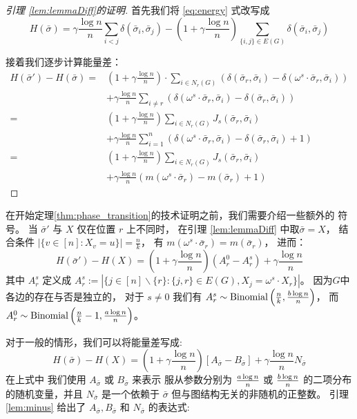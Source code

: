 \begin{proof}[引理 \ref{lem:lemmaDiff}的证明]
	首先我们将
  \eqref{eq:energy} 式改写成
	\begin{equation*}
	H(\bar{\sigma}) = \gamma \frac{\log n}{n} \sum_{i < j} \delta(\bar{\sigma}_i, \bar{\sigma}_j)
	- (1 + \gamma\frac{\log n}{n}) \sum_{ \{i, j\} \in E(G)} \delta(\bar{\sigma}_i, \bar{\sigma}_j)
	\end{equation*}
	
	接着我们逐步计算能量差：
  \begin{align*}
	H(\bar{\sigma}') - H(\bar{\sigma}) =& 
  \left(1 + \gamma\frac{\log n}{n}
  \right)
  \cdot \sum_{i \in N_r(G)} (\delta(\bar{\sigma}_r, \bar{\sigma}_i) -
	\delta(\omega^s \cdot \bar{\sigma}_r, \bar{\sigma}_i)) \\
	&+ \gamma \frac{\log n}{n}\sum_{i\neq r}
	( \delta(\omega^s \cdot \bar{\sigma}_r, \bar{\sigma}_i) -
	\delta( \bar{\sigma}_r, \bar{\sigma}_i) ) \\
	 =& \left(
     1 + \gamma\frac{\log n}{n}
     \right)
   \sum_{i \in N_r(G)} J_s(\bar{\sigma}_r, \bar{\sigma}_i) \\
	&+ \gamma \frac{\log n}{n}\sum_{i=1}^n
	( \delta(\omega^s \cdot \bar{\sigma}_r, \bar{\sigma}_i) -
	\delta( \bar{\sigma}_r, \bar{\sigma}_i) +1) \\
	=& \left(1+\gamma \frac{\log n}{n}
  \right)
  \sum_{i \in N_r(G)} J_s(\bar{\sigma}_r, \bar{\sigma}_i)\\
	&+ \gamma \frac{\log n}{n} (m(\omega^s \cdot \bar{\sigma}_r)-m(\bar{\sigma}_r)+1)
	\end{align*}
\end{proof}

在开始定理\ref{thm:phase_transition}的技术证明之前，我们需要介绍一些额外的
符号。
当 $\bar{\sigma}'$ 与 $X$ 仅在位置 $r$
上不同时， 在引理 \ref{lem:lemmaDiff}
中取$\bar{\sigma}=X$，
结合条件  $|\{v \in [n] : X_v = u\}| = \frac{n}{k}$，
有 $m(\omega^s \cdot \bar{\sigma}_r)
=m(\bar{\sigma}_r)$，
进而：
\begin{equation}\label{eq:energy_diff}
H(\bar{\sigma}') - H(X) = (1+\gamma \frac{\log n}{n})(A^0_r - A^s_r) + \gamma\frac{\log n}{n}
\end{equation}
其中 $A^s_r$ 定义成
$A^s_r := |\{j \in [n]\backslash \{r\}: \{j, r\} \in E(G), X_j = \omega^s \cdot X_r \}|$。
因为$G$中各边的存在与否是独立的，
对于 $s\neq 0$
我们有 $A^s_r \sim \textrm{Binomial}\left(
  \frac{n}{k}, \frac{b \log n}{n} \right) $，
而 $A^0_r \sim \textrm{Binomial}
\left(
  \frac{n}{k}-1, \frac{a \log n}{n} \right)$。

对于一般的情形，我们可以将能量差写成:
\begin{equation}\label{eq:Hgeneral}
H(\bar{\sigma}) - H(X)=
(1 + \gamma \frac{ \log n}{n})[A_{\bar{\sigma}} - B_{\bar{\sigma}}] + \gamma\frac{ \log n}{n} N_{\bar{\sigma}}
\end{equation}
在上式中 我们使用
$A_{\bar{\sigma}}$ 或
$B_{\bar{\sigma}}$ 来表示
服从参数分别为 $\frac{a \log n}{n}$ 或 $\frac{b \log n}{n}$ 的二项分布的随机变量，并且
$N_{\bar{\sigma}}$ 是一个依赖于 $\bar{\sigma}$ 但与图结构无关的非随机的正整数。
引理\ref{lem:minus} 给出了 $A_{\bar{\sigma}}, B_{\bar{\sigma}}$ 和 $N_{\bar{\sigma}}$
的表达式:

